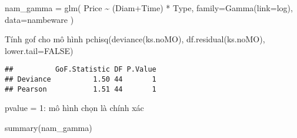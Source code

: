 \documentclass[
]{article}
\newenvironment{Shaded}{\begin{snugshade}}{\end{snugshade}}
\newcommand{\AttributeTok}[1]{\textcolor[rgb]{0.77,0.63,0.00}{#1}}
\newcommand{\ConstantTok}[1]{\textcolor[rgb]{0.00,0.00,0.00}{#1}}
\newcommand{\DecValTok}[1]{\textcolor[rgb]{0.00,0.00,0.81}{#1}}
\newcommand{\FunctionTok}[1]{\textcolor[rgb]{0.00,0.00,0.00}{#1}}
\newcommand{\NormalTok}[1]{#1}
\newcommand{\OtherTok}[1]{\textcolor[rgb]{0.56,0.35,0.01}{#1}}
\newcommand{\SpecialCharTok}[1]{\textcolor[rgb]{0.00,0.00,0.00}{#1}}
\newcommand{\StringTok}[1]{\textcolor[rgb]{0.31,0.60,0.02}{#1}}
\begin{document}
\begin{Shaded}
\begin{Highlighting}[]
\NormalTok{nam\_gamma }\OtherTok{=} \FunctionTok{glm}\NormalTok{( Price }\SpecialCharTok{\textasciitilde{}}\NormalTok{ (Diam}\SpecialCharTok{+}\NormalTok{Time) }\SpecialCharTok{*}\NormalTok{ Type, }\AttributeTok{family=}\FunctionTok{Gamma}\NormalTok{(}\AttributeTok{link=}\NormalTok{log), }\AttributeTok{data=}\NormalTok{nambeware )}
\end{Highlighting}
\end{Shaded}

Tính gof cho mô hình pchisq(deviance(ks.noMO), df.residual(ks.noMO),
lower.tail=FALSE)

\begin{Shaded}
\end{Shaded}

\begin{verbatim}
##          GoF.Statistic DF P.Value
## Deviance          1.50 44       1
## Pearson           1.51 44       1
\end{verbatim}

pvalue = 1: mô hình chọn là chính xác

\begin{Shaded}
\begin{Highlighting}[]
\FunctionTok{summary}\NormalTok{(nam\_gamma)}
\end{Highlighting}
\end{Shaded}
\end{document}
